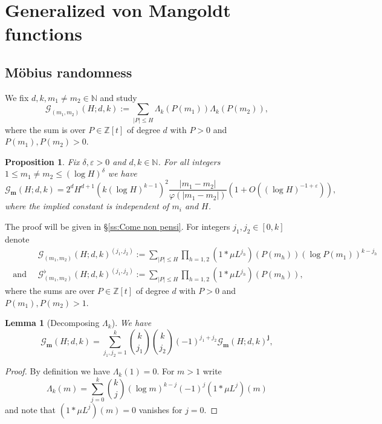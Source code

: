 \documentclass[reqno, 11pt]{amsart}
\numberwithin{equation}{section}
\newtheorem{lemma}[theorem]{Lemma}
\newtheorem{proposition}[theorem]{Proposition}
\theoremstyle{definition}
\renewcommand{\phi}{\varphi}
\newcommand{\0}{\mathbf{0}}
\renewcommand{\leq}{\leqslant}
\renewcommand{\b}{\mathbf{b}}
\renewcommand{\b}{\mathbf}
\renewcommand{\epsilon}{\varepsilon}
\renewcommand{\leq}{\leqslant}
\renewcommand{\#}{\sharp}
\begin{document}
\section{Generalized von Mangoldt functions} \subsection{M\"obius randomness}
\label{ss:mobiusdisjoint} We fix $d,k,m_1\neq m_2\in \mathbb N$
and  study \begin{equation} \label{def:GmGm} \mathcal G_{(m_1,m_2)}(H;d,k):=
\sum_{|P|\leq H} \Lambda_k(P( m_1)) \Lambda_k(P(m_2)),\end{equation} where the sum is over $P\in \mathbb Z[t]$
of degree $d$ with $P>0$ and $P(m_1),P(m_2)>0$. \begin{proposition}\label{prop:casanatense}
Fix $\delta,\epsilon>0$ and $d,k\in \mathbb N$. For all integers  $1\leq m_1\neq m_2 \leq (\log H)^\delta$ we have 
$$\mathcal G_{\b m}(H;d,k)=2^d H^{d+1}  (k (\log H)^{k-1})^2 \frac{|m_1-m_2|}{\phi(|m_1-m_2|)}  
\left(1+ O (    (\log H )^{- 1+ \epsilon} )\right),$$ where the implied constant is independent of $m_i$ and $H$. 
\end{proposition} The proof will be  given in \S \ref{ss:Come non pensi}. For integers $j_1,j_2\in [0,k]$ 
denote  \begin{align*} &\mathcal G_{(m_1,m_2)}(H;d,k)^{(j_1,j_2)}:=\sum_{  |P|\leq H } \prod_{h=1,2} 
(1\ast \mu L^{j_h})(P(m_h)) (\log P(m_1))^{k-j_h}  \\ \ \textrm{ and } \ 
&\mathcal G^\flat_{(m_1,m_2)}(H;d,k)^{(j_1,j_2)}:= \sum_{  |P|\leq H } \prod_{h=1,2} 
(1\ast \mu L^{j_h})(P(m_h))  ,\end{align*} where the sums are over $P\in \mathbb Z[t]$ of degree $d$ with $P>0$ and $P(m_1),P(m_2)>1$. 
\begin{lemma}[Decomposing $\Lambda_k$]\label{lem:decomposition} We have $$\mathcal G_{\b m}(H;d,k)=\sum_{j_1,j_2=1  }^k
{k\choose j_1 } {k\choose j_2 } (-1)^{j_1+j_2} \mathcal G_{\b m}(H;d,k)^{\b j}, $$\end{lemma} \begin{proof} By definition we have
$\Lambda_k(1) =0$. For $m>1$    write  \begin{equation} \label{eq:pergolesi_euridice} \Lambda_k(m)   = \sum_{j=0}^k
{k\choose j } (\log m)^{k-j}(-1)^j (1\ast \mu L^j)(m)\end{equation}  and note that   $(1\ast \mu L^j)(m)=0$ vanishes 
for $j=0$.\end{proof}
\end{document}
